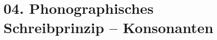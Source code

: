 \documentclass[handout,aspectratio=1610,dvipsnames]{beamer}
\begin{document}
  \section[Konsonantenschreibungen]{04. Phonographisches Schreibprinzip -- Konsonanten}
  \let\woopsi\section\let\section\subsection\let\subsection\subsubsection
  
  \let\subsection\section\let\section\woopsi
  
\end{document}
